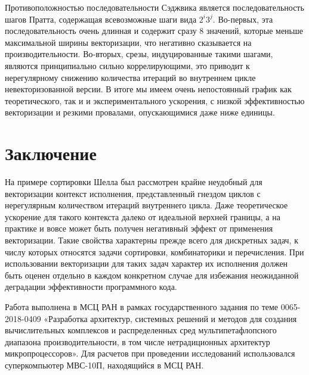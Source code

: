 \documentclass[utf8]{psta}
\begin{document}
Противоположностью последовательности Сэджвика является последовательность шагов Пратта, содержащая всевозможные шаги вида $2^i3^j$.
Во-первых, эта последовательность очень длинная и содержит сразу 8 значений, которые меньше максимальной ширины векторизации, что негативно сказывается на производительности.
Во-вторых, срезы, индуцированные такими шагами, являются принципиально сильно коррелирующими, это приводит к нерегулярному снижению количества итераций во внутреннем цикле невекторизованной версии.
В итоге мы имеем очень непостоянный график как теоретического, так и и экспериментального ускорения, с низкой эффективностью векторизации и резкими провалами, опускающимися даже ниже единицы.

\section*{Заключение}

На примере сортировки Шелла был рассмотрен крайне неудобный для векторизации контекст исполнения, представленный гнездом циклов с нерегулярным количеством итераций внутреннего цикла.
Даже теоретическое ускорение для такого контекста далеко от идеальной верхней границы, а на практике и вовсе может быть получен негативный эффект от применения векторизации.
Такие свойства характерны прежде всего для дискретных задач, к числу которых относятся задачи сортировки, комбинаторики и перечисления.
При использовании векторизации для таких задач характер их исполнения должен быть оценен отдельно в каждом конкретном случае для избежания неожиданной деградации эффективности программного кода.

\vspace{\baselineskip}

Работа выполнена в МСЦ РАН в рамках государственного задания по теме 0065-2018-0409 «Разработка архитектур, системных решений и методов для создания вычислительных комплексов и распределенных сред мультипетафлопсного диапазона производительности, в том числе нетрадиционных архитектур микропроцессоров».
Для расчетов при проведении исследований использовался суперкомпьютер МВС-10П, находящийся в МСЦ РАН.
\end{document}
